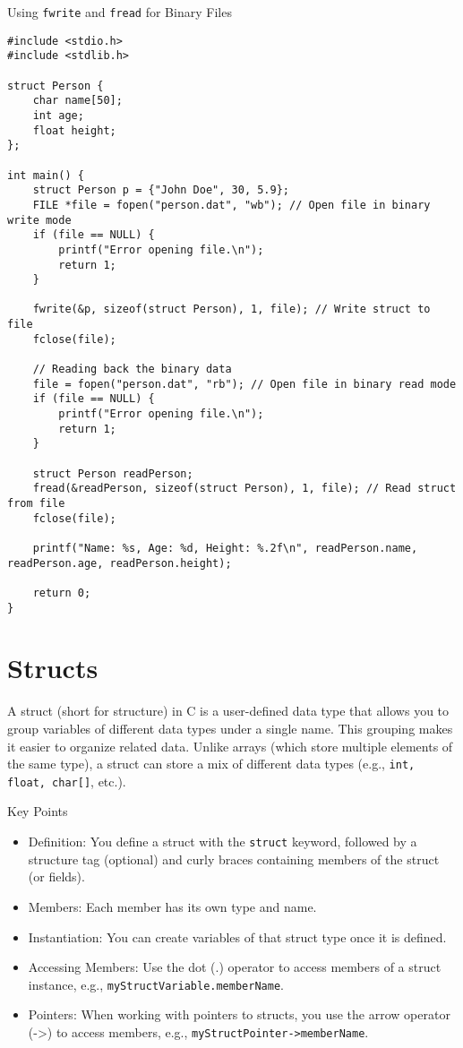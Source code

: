 \documentclass[a4paper,12pt]{article}
\begin{document}
Using \verb|fwrite| and \verb|fread| for Binary Files

\lstset{language=C}
\begin{lstlisting}
#include <stdio.h>
#include <stdlib.h>

struct Person {
    char name[50];
    int age;
    float height;
};

int main() {
    struct Person p = {"John Doe", 30, 5.9};
    FILE *file = fopen("person.dat", "wb"); // Open file in binary write mode
    if (file == NULL) {
        printf("Error opening file.\n");
        return 1;
    }

    fwrite(&p, sizeof(struct Person), 1, file); // Write struct to file
    fclose(file);

    // Reading back the binary data
    file = fopen("person.dat", "rb"); // Open file in binary read mode
    if (file == NULL) {
        printf("Error opening file.\n");
        return 1;
    }

    struct Person readPerson;
    fread(&readPerson, sizeof(struct Person), 1, file); // Read struct from file
    fclose(file);

    printf("Name: %s, Age: %d, Height: %.2f\n", readPerson.name, readPerson.age, readPerson.height);

    return 0;
}
\end{lstlisting}

\newpage

\section{Structs}

A struct (short for structure) in C is a user-defined data type that allows you to group variables of different data types under a single name. This grouping makes it easier to organize related data. Unlike arrays (which store multiple elements of the same type), a struct can store a mix of different data types (e.g., \verb|int, float, char[]|, etc.).

Key Points

\begin{itemize}
    \item Definition: You define a struct with the \verb|struct| keyword, followed by a structure tag (optional) and curly braces containing members of the struct (or fields).
    \item Members: Each member has its own type and name.
    \item Instantiation: You can create variables of that struct type once it is defined.
    \item Accessing Members: Use the dot (.) operator to access members of a struct instance, e.g., \verb|myStructVariable.memberName|.
    \item Pointers: When working with pointers to structs, you use the arrow operator (->) to access members, e.g., \verb|myStructPointer->memberName|.
\end{itemize}
\end{document}

